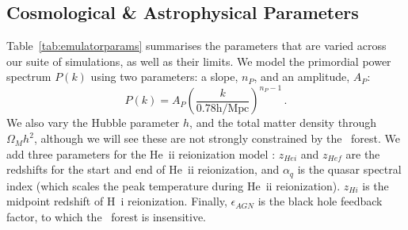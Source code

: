 
\subsection{Cosmological \& Astrophysical Parameters}\label{sec:parameters}

Table~\ref{tab:emulatorparams} summarises the parameters that are varied across our suite of simulations, as well as their limits.
We model the primordial power spectrum $P(k)$ using two parameters: a slope, $n_P$, and an amplitude, $A_P$:
\begin{equation}
    P(k) = A_P \left(\frac{k}{0.78 \mathrm{h/Mpc}}\right)^{n_P - 1}\,.
\end{equation}
We also vary the Hubble parameter $h$, and the total matter density through $\Omega_M h^2$, although we will see these are not strongly constrained by the \Lya~forest. We add three parameters for the He~{\sc ii} reionization model \cite{2020MNRAS.496.4372U}: $z_{Hei}$ and $z_{Hef}$ are the redshifts for the start and end of He~{\sc ii} reionization, and $\alpha_q$ is the quasar spectral index (which scales the peak temperature during He~{\sc ii} reionization).
$z_{Hi}$ is the midpoint redshift of H~{\sc i} reionization.
Finally, $\epsilon_{AGN}$ is the black hole feedback factor, to which the \lya~forest is insensitive.

